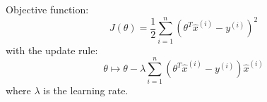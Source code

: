 \begin{answer}
Objective function:
\begin{equation*}
    J(\theta) = \frac{1}{2}\sum_{i=1}^{n}(\theta^T \hat{x}^{(i)} - y^{(i)})^2
\end{equation*}
with the update rule:
\begin{equation*}
    \theta \mapsto \theta - \lambda \sum_{i=1}^{n}(\theta^T \hat{x}^{(i)} - y^{(i)}) \hat{x}^{(i)}
\end{equation*}
where $\lambda$ is the learning rate.
\end{answer}
